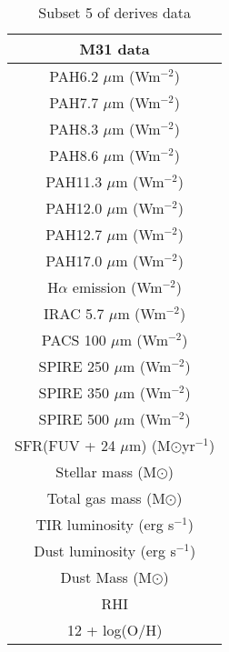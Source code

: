 \begin{table}
\centering
\caption{Subset 5 of derives data}
\label{tab: subset3}
\begin{tabular}{ |c| }
\hline
M31 data  \\
\hline\hline
PAH6.2 $\mu$m (Wm$^{-2}$)  \\
PAH7.7 $\mu$m (Wm$^{-2}$)  \\
PAH8.3 $\mu$m (Wm$^{-2}$)  \\
PAH8.6 $\mu$m (Wm$^{-2}$)  \\
PAH11.3 $\mu$m (Wm$^{-2}$)  \\
PAH12.0 $\mu$m (Wm$^{-2}$) \\
PAH12.7 $\mu$m (Wm$^{-2}$)  \\
PAH17.0 $\mu$m (Wm$^{-2}$)  \\
H$\alpha$ emission (Wm$^{-2}$) \\
IRAC 5.7 $\mu$m (Wm$^{-2}$)\\
PACS 100 $\mu$m (Wm$^{-2}$)\\
SPIRE 250 $\mu$m (Wm$^{-2}$)\\
SPIRE 350 $\mu$m (Wm$^{-2}$)\\
SPIRE 500 $\mu$m (Wm$^{-2}$)\\
SFR(FUV + 24 $\mu$m) (M$\odot$yr$^{-1}$) \\
Stellar mass (M$\odot$)\\
Total gas mass (M$\odot$)  \\
TIR luminosity (erg s$^{-1}$)  \\
Dust luminosity (erg s$^{-1}$)  \\
Dust Mass (M$\odot$)\\
RHI \\
12 + log(O/H)\\
\hline
\end{tabular}
\end{table}